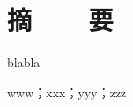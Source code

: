 \chapter*{摘~~~~要}

{
\linespread{1.5}
\fangsong\xiaosi

blabla

\vspace{2em}
\setlength{\parindent}{0em}
 www；xxx；yyy；zzz \par
}
